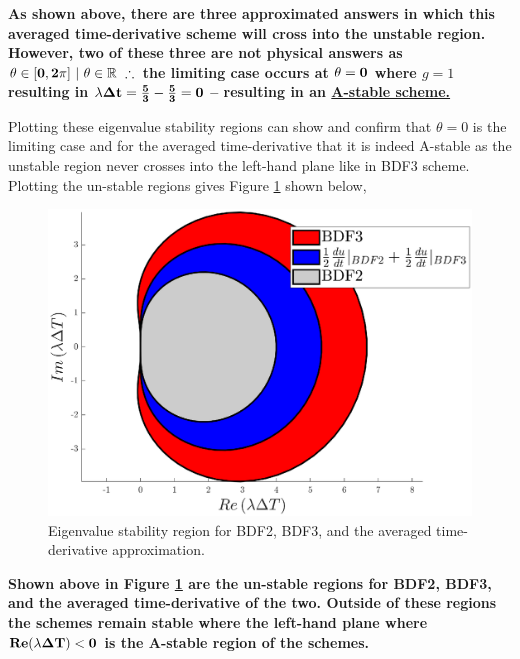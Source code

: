 \begin{enumerate}[label=\alph*., start = 2]
    \vspace{-0.25in}
    \begin{fminipage}{0.9\linewidth}
        \textbf{As shown above, there are three approximated answers in which this averaged time-derivative scheme will cross into the unstable region. However, two of these three are not physical answers as $\bf \theta \in [0, 2\pi]\ |\ \theta \in \mathbb{R}\ \therefore$ the limiting case occurs at $\bf \theta = 0$ where $g=1$ resulting in $\bf \lambda\Delta t = \frac{5}{3} - \frac{5}{3} = 0$ -- resulting in an \underline{A-stable scheme.}}
    \end{fminipage}
    
    \pagebreak

    Plotting these eigenvalue stability regions can show and confirm that $\theta = 0$ is the limiting case and for the averaged time-derivative that it is indeed A-stable as the unstable region never crosses into the left-hand plane like in BDF3 scheme. Plotting the un-stable regions gives Figure \ref{fig:q1_eigs} shown below,

    \begin{figure}[h]
        \centering
        \includegraphics[width = 0.9\linewidth]{q1/eigs.eps}
        \caption{Eigenvalue stability region for BDF2, BDF3, and the averaged time-derivative approximation.}
        \label{fig:q1_eigs}
    \end{figure}

    \begin{fminipage}{0.9\linewidth}
        \textbf{Shown above in Figure \ref{fig:q1_eigs} are the un-stable regions for BDF2, BDF3, and the averaged time-derivative of the two. Outside of these regions the schemes remain stable where the left-hand plane where $\bf Re(\lambda \Delta T) < 0$ is the A-stable region of the schemes.}
    \end{fminipage}
\end{enumerate}

